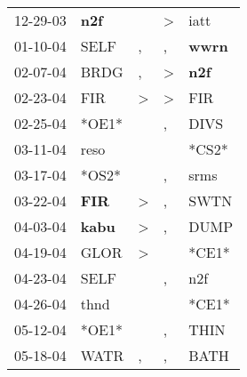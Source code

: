 \begin{supertabular}{p{0.07\textwidth}p{0.06\textwidth}p{0.02\textwidth}p{0.02\textwidth}p{0.06\textwidth}}
          12-29-03\textsuperscript{} &   \textbf{n2f\textsuperscript{}} &                  &     \textgreater &           iatt\textsuperscript{} \\
          01-10-04\textsuperscript{} &           SELF\textsuperscript{} &                , &                , &  \textbf{wwrn\textsuperscript{}} \\
          02-07-04\textsuperscript{} &           BRDG\textsuperscript{} &                , &     \textgreater &   \textbf{n2f\textsuperscript{}} \\
          02-23-04\textsuperscript{} &            FIR\textsuperscript{} &     \textgreater &     \textgreater &            FIR\textsuperscript{} \\
          02-25-04\textsuperscript{} &                            *OE1* &                  &                , &           DIVS\textsuperscript{} \\
          03-11-04\textsuperscript{} &           reso\textsuperscript{} &                  &                  &                            *CS2* \\
          03-17-04\textsuperscript{} &                            *OS2* &                  &                , &           srms\textsuperscript{} \\
          03-22-04\textsuperscript{} &   \textbf{FIR\textsuperscript{}} &     \textgreater &                , &           SWTN\textsuperscript{} \\
          04-03-04\textsuperscript{} &  \textbf{kabu\textsuperscript{}} &     \textgreater &                , &           DUMP\textsuperscript{} \\
          04-19-04\textsuperscript{} &           GLOR\textsuperscript{} &     \textgreater &                  &                            *CE1* \\
          04-23-04\textsuperscript{} &           SELF\textsuperscript{} &                  &                , &            n2f\textsuperscript{} \\
          04-26-04\textsuperscript{} &           thnd\textsuperscript{} &                  &                  &                            *CE1* \\
          05-12-04\textsuperscript{} &                            *OE1* &                  &                , &           THIN\textsuperscript{} \\
          05-18-04\textsuperscript{} &           WATR\textsuperscript{} &                , &                , &           BATH\textsuperscript{} \\

\end{supertabular}

